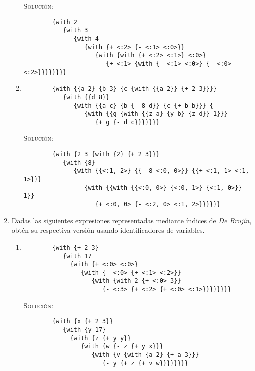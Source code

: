 \documentclass[letterpaper,11pt]{article}
\begin{document}
\begin{enumerate}
\begin{enumerate}
        \textsc{Solución:}
        \begin{verbatim}
        {with 2 
           {with 3 
              {with 4
                 {with {+ <:2> {- <:1> <:0>}} 
                    {with {with {+ <:2> <:1>} <:0>} 
                       {+ <:1> {with {- <:1> <:0>} {- <:0> <:2>}}}}}}}}
        \end{verbatim}

        \item 
        \begin{verbatim}
        {with {{a 2} {b 3} {c {with {{a 2}} {+ 2 3}}}} 
           {with {{d 8}} 
              {with {{a c} {b {- 8 d}} {c {+ b b}}} {
                 {with {{g {with {{z a} {y b} {z d}} 1}}} 
                    {+ g {- d c}}}}}}}
        \end{verbatim}

        \textsc{Solución:}
        \begin{verbatim}
        {with {2 3 {with {2} {+ 2 3}}} 
           {with {8} 
              {with {{<:1, 2>} {{- 8 <:0, 0>}} {{+ <:1, 1> <:1, 1>}}} 
                 {with {{with {{<:0, 0>} {<:0, 1>} {<:1, 0>}} 1}} 
                    {+ <:0, 0> {- <:2, 0> <:1, 2>}}}}}}
        \end{verbatim}
    \end{enumerate}

    \item Dadas las siguientes expresiones representadas mediante índices de 
    \textit{De Brujín}, obtén su respectiva versión usando identificadores de 
    variables.
    \begin{enumerate}
        \item 
        \begin{verbatim}
        {with {+ 2 3} 
           {with 17 
             {with {+ <:0> <:0>} 
                {with {- <:0> {+ <:1> <:2>}} 
                   {with {with 2 {+ <:0> 3}} 
                      {- <:3> {+ <:2> {+ <:0> <:1>}}}}}}}}
        \end{verbatim}

        \textsc{Solución:}
        \begin{verbatim}
        {with {x {+ 2 3}} 
           {with {y 17} 
             {with {z {+ y y}} 
                {with {w {- z {+ y x}}} 
                   {with {v {with {a 2} {+ a 3}}} 
                      {- y {+ z {+ v w}}}}}}}}
        \end{verbatim}


\end{enumerate}
\end{enumerate}
\end{document}
